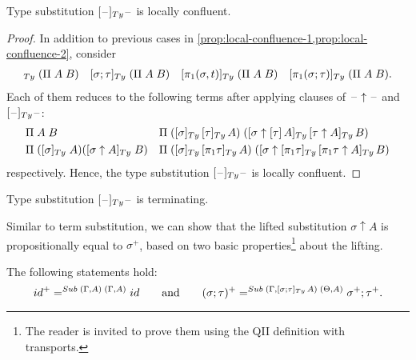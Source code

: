 \documentclass[a4paper,UKenglish,numberwithinsect,cleveref,thm-restate]{lipics-v2021}
\newcommand{\danger}{\marginpar[\hfill\dbend]{\dbend\hfill}}
\begin{document}
\begin{proposition}\label{prop:local-confluence-3}
  Type substitution $[\blank]_{\Ty}\blank$ is locally confluent.
  \danger
\end{proposition}
\begin{proof}
  In addition to previous cases in \cref{prop:local-confluence-1,prop:local-confluence-2}, consider
  \begin{align*}
    [\idS]_{\Ty}\;(\Pi\;A\;B) && [\sigma;\tau]_{\Ty}\;(\Pi\;A\;B) && [\pi_1(\sigma, t)]_{\Ty}\;(\Pi\;A\;B) && [\pi_1(\sigma; \tau)]_{\Ty}\;(\Pi\;A\;B).
  \end{align*}
  Each of them reduces to the following terms after applying clauses of $\mathord{\hspace{1pt}\text{--}\hspace{1pt}}\uparrow\mathord{\hspace{1pt}\text{--}\hspace{1pt}}$ and $[\blank]_{\Ty}\blank$:
  \begin{align*}
    & \Pi\;A\;B                && \Pi\;([\sigma]_{\Ty}\,[\tau]_{\Ty}\,A)\;([\sigma \uparrow [\tau]\,A ]_{\Ty}\,[\tau \uparrow A ]_{\Ty}\,B) \\
    & \Pi\;([\sigma]_{\Ty}\;A)([\sigma \uparrow A]_{\Ty}\;B) && \Pi\;([\sigma]_{\Ty}\,[\pi_1\tau]_{\Ty}\,A)\;([\sigma \uparrow [\pi_1\tau]_{\Ty}\,[\pi_1\tau \uparrow A]_{\Ty}\,B)
  \end{align*}
  respectively.
  Hence, the type substitution $[\blank]_{\Ty}\blank$ is locally confluent.
\end{proof}
\begin{proposition}[Termination]
  Type substitution $[\blank]_{\Ty}\blank$ is terminating.
  \danger
\end{proposition}

Similar to term substitution, we can show that the lifted substitution $\sigma \uparrow A$ is propositionally equal to $\sigma^+$, based on two basic properties\footnote{%
  The reader is invited to prove them using the QII definition with transports.}
about the lifting.
\begin{lemma} \label{lem:lifting}
  The following statements hold:
  \[
    \idS^+ =^{\Sub\;(\Gamma, A)\;(\Gamma, A)} \idS
    \qquad\text{and}\qquad
    (\sigma; \tau)^+     =^{\Sub\;(\Gamma, [\sigma; \tau]_{\Ty}\,A)\;(\Theta, A)} \sigma^+ ; \tau^+.
  \]
\end{lemma}
\end{document}
